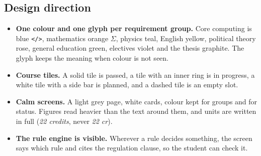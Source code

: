 \documentclass{article}
\begin{document}
\subsection{Design direction}
\begin{itemize}
  \item \textbf{One colour and one glyph per requirement group.} Core computing is blue \texttt{</>}, mathematics orange
        $\Sigma$, physics teal, English yellow, political theory rose, general education green, electives violet and the
        thesis graphite. The glyph keeps the meaning when colour is not seen.
  \item \textbf{Course tiles.} A solid tile is passed, a tile with an inner ring is in progress, a white tile with a side
        bar is planned, and a dashed tile is an empty slot.
  \item \textbf{Calm screens.} A light grey page, white cards, colour kept for groups and for status. Figures read heavier
        than the text around them, and units are written in full (\emph{22 credits}, never \emph{22 cr}).
  \item \textbf{The rule engine is visible.} Wherever a rule decides something, the screen says which rule and cites
        the regulation clause, so the student can check it.
\end{itemize}
\end{document}
